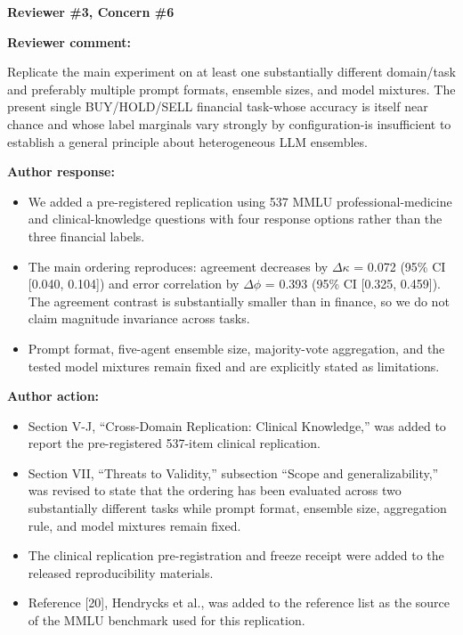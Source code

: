 \documentclass[11pt]{article}
\newcommand{\rvcomment}[1]{{\color{ReviewerGreen}#1}}
\newcommand{\concern}[1]{\textbf{\color{ReviewerGreen}#1}}
\begin{document}
\vspace{12pt}
\concern{Reviewer \#3, Concern \#6}

\concern{Reviewer comment:}

\rvcomment{Replicate the main experiment on at least one substantially different domain/task and preferably multiple prompt formats, ensemble sizes, and model mixtures. The present single BUY/HOLD/SELL financial task-whose accuracy is itself near chance and whose label marginals vary strongly by configuration-is insufficient to establish a general principle about heterogeneous LLM ensembles.}

\textbf{Author response:}

\begin{itemize}

\item We added a pre-registered replication using 537 MMLU professional-medicine and clinical-knowledge questions with four response options rather than the three financial labels.

\item The main ordering reproduces: agreement decreases by $\Delta$$\kappa$ = 0.072 (95\% CI [0.040, 0.104]) and error correlation by $\Delta$$\phi$ = 0.393 (95\% CI [0.325, 0.459]). The agreement contrast is substantially smaller than in finance, so we do not claim magnitude invariance across tasks.

\item Prompt format, five-agent ensemble size, majority-vote aggregation, and the tested model mixtures remain fixed and are explicitly stated as limitations.

\end{itemize}

\textbf{Author action:}

\begin{itemize}

\item Section V-J, ``Cross-Domain Replication: Clinical Knowledge,'' was added to report the pre-registered 537-item clinical replication.

\item Section VII, ``Threats to Validity,'' subsection ``Scope and generalizability,'' was revised to state that the ordering has been evaluated across two substantially different tasks while prompt format, ensemble size, aggregation rule, and model mixtures remain fixed.

\item The clinical replication pre-registration and freeze receipt were added to the released reproducibility materials.

\item Reference [20], Hendrycks et al., was added to the reference list as the source of the MMLU benchmark used for this replication.

\end{itemize}
\end{document}
